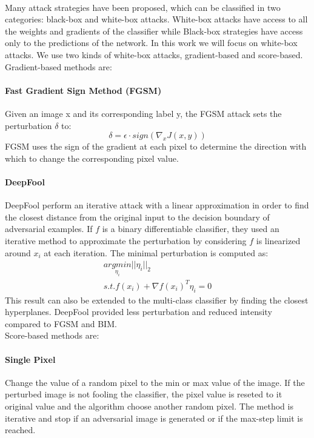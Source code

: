 \documentclass[12pt]{article}
\begin{document}
\paragraph{}
Many attack strategies have been proposed, which can be classified in two categories: black-box and white-box attacks. White-box attacks have access to all the weights and gradients of the
classifier while Black-box strategies have access only to the predictions of the network. In this work we will focus on white-box attacks. We use two kinds of white-box attacks, gradient-based and score-based. Gradient-based methods are:

\paragraph{Fast Gradient Sign Method (FGSM)}
Given an image x and its corresponding label y, the FGSM attack sets the perturbation $\delta$ to:
\begin{equation}\label{eq:fgsm}
\delta = \epsilon \cdot sign(\nabla_{x}J(x,y))
\end{equation}
FGSM \cite{goodfellow_explaining_2014} uses the sign of the gradient at each pixel to determine the direction with which to change the corresponding pixel value.


\paragraph{DeepFool}
DeepFool \cite{moosavi-dezfooli_deepfool:_2015} perform an iterative attack with a linear approximation in order to find the closest distance from the original input to the decision boundary of adversarial examples. If $f$ is a binary differentiable classifier, they used an iterative
method to approximate the perturbation by considering $f$ is linearized around $x_{i}$ at each iteration. The minimal perturbation is computed as:
\begin{equation}\label{eq:deepfool}
\begin{multlined}
\underset{\eta_{i}}{arg min} ||\eta_{i}||_{2} \\
s.t. f(x_{i}) + \nabla f(x_{i})^{T} \eta_{i} = 0
\end{multlined}
\end{equation}
This result can also be extended to the multi-class classifier by finding the closest hyperplanes.
DeepFool provided less perturbation and reduced intensity compared to FGSM and BIM.
\\
Score-based methods are:
\paragraph{Single Pixel}
Change the value of a random pixel to the min or max value of the image. If the perturbed image is not fooling the classifier, the pixel value is reseted to it original value and the algorithm choose another random pixel. The method is iterative and stop if an adversarial image is generated or if the max-step limit is reached.
\end{document}
